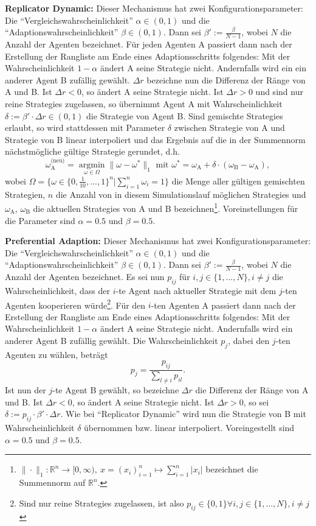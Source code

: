 \documentclass[parskip=full,11pt]{scrartcl}
\def\adapt{Adaptionsschritt}
\begin{document}
\textbf{Replicator Dynamic:}
Dieser Mechanismus hat zwei Konfigurationsparameter: Die \enquote{Vergleichswahrscheinlichkeit} \(\alpha \in (0,1)\) und die \enquote{Adaptionswahrscheinlichkeit} \(\beta \in (0,1)\). Dann sei \(\beta' := \frac{\beta}{N-1}\), wobei \(N\) die Anzahl der Agenten bezeichnet. Für jeden Agenten A passiert dann nach der Erstellung der Rangliste am Ende eines \adapt s folgendes: Mit der Wahrscheinlichkeit \(1 - \alpha\) ändert A seine \Gls{Strategie} nicht. Andernfalls wird ein ein anderer Agent B zufällig gewählt. \(\Delta r\) bezeichne nun die Differenz der Ränge von A und B. Ist \(\Delta r < 0\), so ändert A seine \Gls{Strategie} nicht. Ist \(\Delta r > 0\) und sind nur reine \Glspl{Strategie} zugelassen, so übernimmt Agent A mit Wahrscheinlichkeit \(\delta := \beta' \cdot \Delta r \in (0,1)\) die \Gls{Strategie} von Agent B. Sind \glspl{gemischte Strategie} erlaubt, so wird stattdessen mit Parameter \(\delta\) zwischen \Gls{Strategie} von A und \Gls{Strategie} von B linear interpoliert und das Ergebnis auf die in der Summennorm nächstmögliche gültige \Gls{Strategie} gerundet, d.h.
\[
\omega_\text{A}^\text{(neu)} = \underset{\omega \in \Omega}{\operatorname{arg min}} \|\omega - \omega^*\|_1 \text{  mit  } \omega^* = \omega_\text{A} + \delta \cdot (\omega_\text{B} - \omega_\text{A}),
\]
wobei \(\Omega = \{\omega \in \{0,\frac{1}{10},...,1\}^n | \sum_{i=1}^n \omega_i = 1\}\) die Menge aller gültigen gemischten Strategien, \(n\) die Anzahl von in diesem Simulationslauf möglichen \Glspl{Strategie} und \(\omega_\text{A}\), \(\omega_\text{B}\) die aktuellen \Glspl{Strategie} von A und B bezeichnen\footnote{\(\|\cdot\|_1 : \mathbb{R}^n \rightarrow [0,\infty), \ x = (x_i)_{i=1}^n \mapsto \sum_{i=1}^n |x_i|\) bezeichnet die Summennorm auf \(\mathbb{R}^n\).}. Voreinstellungen für die Parameter sind \(\alpha = 0.5\) und \(\beta = 0.5\).

\textbf{Preferential Adaption:}
Dieser Mechanismus hat zwei Konfigurationsparameter: Die \enquote{Vergleichswahrscheinlichkeit} \(\alpha \in (0,1)\) und die \enquote{Adaptionswahrscheinlichkeit} \(\beta \in (0,1)\). Dann sei \(\beta' := \frac{\beta}{N-1}\), wobei \(N\) die Anzahl der Agenten bezeichnet. Es sei nun \(p_{ij}\) für \(i,j \in \{1,...,N\}, i \neq j\) die Wahrscheinlichkeit, dass der \(i\)-te Agent nach aktueller \Gls{Strategie} mit dem \(j\)-ten Agenten kooperieren würde\footnote{Sind nur reine \Glspl{Strategie} zugelassen, ist also \(p_{ij} \in \{0,1\} \forall i,j \in \{1,...,N\}, i \neq j\)}. Für den \(i\)-ten Agenten A passiert dann nach der Erstellung der Rangliste am Ende eines \adapt s folgendes: Mit der Wahrscheinlichkeit \(1 - \alpha\) ändert A seine \Gls{Strategie} nicht. Andernfalls wird ein anderer Agent B zufällig gewählt. Die Wahrscheinlichkeit \(p_j\), dabei den \(j\)-ten Agenten zu wählen, beträgt
\[
p_j = \frac{p_{ij}}{\sum_{l \neq i} p_{il}}.
\]
Ist nun der \(j\)-te Agent B gewählt, so bezeichne \(\Delta r\) die Differenz der Ränge von A und B. Ist \(\Delta r < 0\), so ändert A seine \Gls{Strategie} nicht. Ist \(\Delta r > 0\), so sei \(\delta := p_{ij} \cdot \beta' \cdot \Delta r\). Wie bei \enquote{Replicator Dynamic} wird nun die \Gls{Strategie} von B mit Wahrscheinlichkeit \(\delta\) übernommen bzw. linear interpoliert. Voreingestellt sind \(\alpha = 0.5\) und \(\beta = 0.5\).
\end{document}
